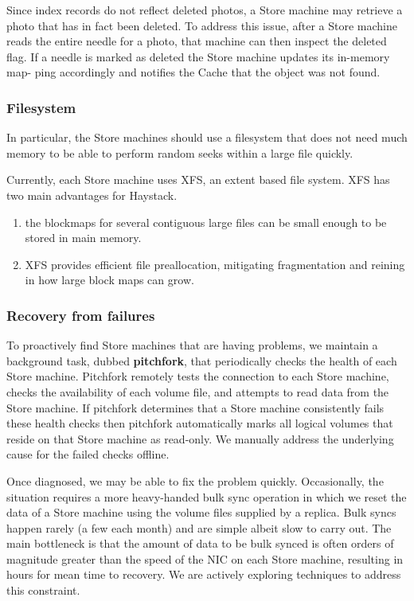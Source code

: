 \documentclass[11pt]{article}
\begin{document}
Since index records do not reflect deleted photos, a Store machine may retrieve a photo that has in
fact been deleted. To address this issue, after a Store machine reads the entire needle for a photo,
that machine can then inspect the deleted flag. If a needle is marked as deleted the Store machine
updates its in-memory map- ping accordingly and notifies the Cache that the object was not found.
\subsubsection{Filesystem}
\label{sec:org96191cf}
In particular, the Store machines should use a filesystem that does not need much memory to be able to
perform random seeks within a large file quickly.

Currently, each Store machine uses XFS, an extent based file system. XFS has two main advantages for
Haystack.
\begin{enumerate}
\item the blockmaps for several contiguous large files can be small enough to be stored in main memory.
\item XFS provides efficient file preallocation, mitigating fragmentation and reining in how large block
maps can grow.
\end{enumerate}
\subsubsection{Recovery from failures}
\label{sec:org67d7710}
To proactively find Store machines that are having problems, we maintain a background task, dubbed
\textbf{pitchfork}, that periodically checks the health of each Store machine. Pitchfork remotely tests the
connection to each Store machine, checks the availability of each volume file, and attempts to read
data from the Store machine. If pitchfork determines that a Store machine consistently fails these
health checks then pitchfork automatically marks all logical volumes that reside on that Store machine
as read-only. We manually address the underlying cause for the failed checks offline.

Once diagnosed, we may be able to fix the problem quickly. Occasionally, the situation requires a more
heavy-handed bulk sync operation in which we reset the data of a Store machine using the volume files
supplied by a replica. Bulk syncs happen rarely (a few each month) and are simple albeit slow to carry
out. The main bottleneck is that the amount of data to be bulk synced is often orders of magnitude
greater than the speed of the NIC on each Store machine, resulting in hours for mean time to recovery.
We are actively exploring techniques to address this constraint.
\end{document}
